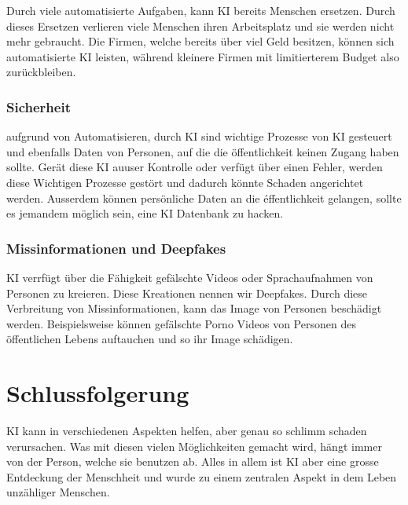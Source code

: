 \documentclass{report}
\begin{document}
Durch viele automatisierte Aufgaben, kann KI bereits Menschen ersetzen. Durch dieses Ersetzen verlieren viele Menschen ihren Arbeitsplatz und sie werden nicht mehr gebraucht. Die Firmen, welche bereits über viel Geld besitzen, können sich automatisierte KI leisten, während kleinere Firmen mit limitierterem Budget also zurückbleiben.

\subsection{Sicherheit}

aufgrund von Automatisieren, durch KI sind wichtige Prozesse von KI gesteuert und ebenfalls Daten von Personen, auf die die öffentlichkeit keinen Zugang haben sollte. Gerät diese KI auuser Kontrolle oder verfügt über einen Fehler, werden diese Wichtigen Prozesse gestört und dadurch könnte Schaden angerichtet werden. Ausserdem können persönliche Daten an die éffentlichkeit gelangen, sollte es jemandem möglich sein, eine KI Datenbank zu hacken. 

\subsection{Missinformationen und Deepfakes}

KI verrfügt über die Fähigkeit gefälschte Videos oder Sprachaufnahmen von Personen zu kreieren. Diese Kreationen nennen wir Deepfakes. Durch diese Verbreitung von Missinformationen, kann das Image von Personen beschädigt werden. Beispielsweise können gefälschte Porno Videos von Personen des öffentlichen Lebens auftauchen und so ihr Image schädigen.

\chapter{Schlussfolgerung}

KI kann in verschiedenen Aspekten helfen, aber genau so schlimm schaden verursachen. Was mit diesen vielen Möglichkeiten gemacht wird, hängt immer von der Person, welche sie benutzen ab. Alles in allem ist KI aber eine grosse Entdeckung der Menschheit und wurde zu einem zentralen Aspekt in dem Leben unzähliger Menschen.

\nocite{*}
\printbibliography
\end{document}

